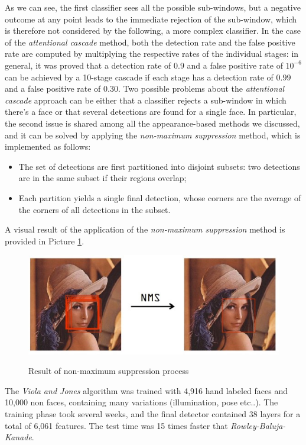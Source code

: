  As we can see, the first classifier sees all the possible sub-windows, but a negative outcome at any point leads to the immediate rejection of the sub-window, which is therefore not considered by the following, a more complex classifier. In the case of the \textit{attentional cascade} method, both the detection rate and the false positive rate are computed by multiplying the respective rates of the individual stages: in general, it was proved that a detection rate of $0.9$ and a false positive rate of $10^{-6}$ can be achieved by a 10-stage cascade if each stage has a detection rate of $0.99$ and a false positive rate of $0.30$. Two possible problems about the \textit{attentional cascade} approach can be either that a classifier rejects a sub-window in which there's a face or that several detections are found for a single face. In particular, the second issue is shared among all the appearance-based methods we discussed, and it can be solved by applying the \textit{non-maximum suppression} method, which is implemented as follows:

 \begin{itemize}
     \item The set of detections are first partitioned into disjoint subsets: two detections are in the same subset if their regions overlap;
     \item Each partition yields a single final detection, whose corners are the average of the corners of all detections in the subset.
 \end{itemize}

A visual result of the application of the \textit{non-maximum suppression} method is provided in Picture \ref{nms}.

\begin{figure}[h!]
		\centering
		\includegraphics[scale = 1.8]{img/nms.jpg}
        \label{nms}
        \caption{Result of non-maximum suppression process}
\end{figure}

The \textit{Viola and Jones} algorithm was trained with 4,916 hand labeled faces and 10,000 non faces, containing many variations (illumination, pose etc..). The training phase took several weeks, and the final detector contained 38 layers for a total of 6,061 features. The test time was 15 times faster that \textit{Rowley-Baluja-Kanade}.
